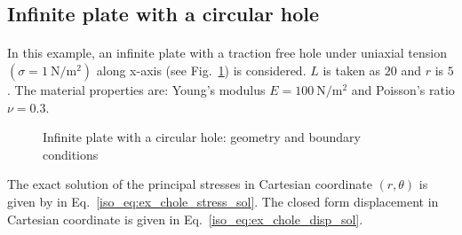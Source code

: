 \subsection{Infinite plate with a circular hole}
\paragraph{}
In this example, an infinite plate with a traction free hole under uniaxial tension $(\sigma = \SI{1}{\newton \per \square \meter} )$ along x-axis (see Fig.~\ref{qdt_fig:ex_chole_geo_bc}) is considered.
$L$ is taken as $20$ and $r$ is $5$.
The material properties are: Young’s modulus $E = \SI{100}{\newton \per \square \meter}$ and Poisson’s ratio $\nu = 0.3$.
    \begin{figure}[H]
        \centering
        \caption{ Infinite plate with a circular hole: geometry and boundary conditions}
        \label{qdt_fig:ex_chole_geo_bc}
    \end{figure}
%
The exact solution of the principal stresses in Cartesian coordinate $(r,\theta)$ is given by \citep{Sukumar2001} in Eq.~\ref{iso_eq:ex_chole_stress_sol}.
The closed form displacement in Cartesian coordinate is given in Eq.~\ref{iso_eq:ex_chole_disp_sol}.
